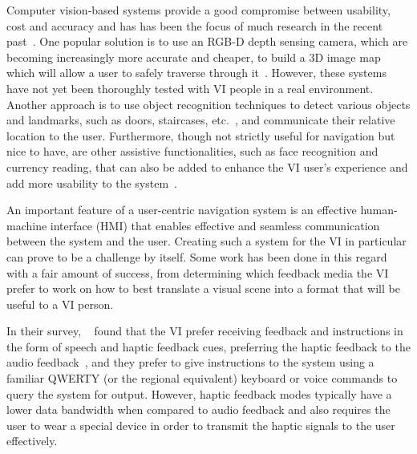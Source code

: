 \documentclass[format=sigconf, review=true, screen=true, anonymous=true]{acmart}
\begin{document}
Computer vision-based systems provide a good compromise between usability, cost and accuracy and has has been the focus of much research in the recent past~\cite{manduchi2014last}. One popular solution is to use an RGB-D depth sensing camera, which are becoming increasingly more accurate and cheaper, to build a 3D image map which will allow a user to safely traverse through it~\cite{lee2015, rodriguez2012obstacle}. However, these systems have not yet been thoroughly tested with VI people in a real environment. Another approach is to use object recognition techniques to detect various objects and landmarks, such as doors, staircases, etc.~\cite{tian2013b}, and communicate their relative location to the user. Furthermore, though not strictly useful for navigation but nice to have, are other assistive functionalities, such as face recognition and currency reading, that can also be added to enhance the VI user's experience and add more usability to the system~\cite{chessa2016}.



An important feature of a user-centric navigation system is an effective human-machine interface (HMI) that enables effective and seamless communication between the system and the user. Creating such a system for the VI in particular can prove to be a challenge by itself. Some work has been done in this regard with a fair amount of success, from determining which feedback media the VI prefer to work on how to best translate a visual scene into a format that will be useful to a VI person. 

In their survey, \citeauthor{khoo2016multimodal}~\cite{khoo2016multimodal} found that the VI prefer receiving feedback and instructions in the form of speech and haptic feedback cues, preferring the haptic feedback to the audio feedback~\cite{ross2000wearable}, and they prefer to give instructions to the system using a familiar QWERTY (or the regional equivalent) keyboard or voice commands to query the system for output. However, haptic feedback modes typically have a lower data bandwidth when compared to audio feedback and also requires the user to wear a special device in order to transmit the haptic signals to the user effectively. 
\end{document}
